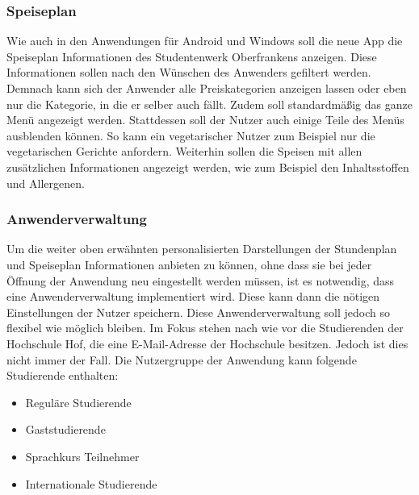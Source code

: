 \subsubsection{Speiseplan}

Wie auch in den Anwendungen für Android und Windows soll die neue \ac{App} die Speiseplan Informationen des Studentenwerk Oberfrankens anzeigen. Diese Informationen sollen nach den Wünschen des Anwenders gefiltert werden. Demnach kann sich der Anwender alle Preiskategorien anzeigen lassen oder eben nur die Kategorie, in die er selber auch fällt. Zudem soll standardmäßig das ganze Menü angezeigt werden. Stattdessen soll der Nutzer auch einige Teile des Menüs ausblenden können. So kann ein vegetarischer Nutzer zum Beispiel nur die vegetarischen Gerichte anfordern. Weiterhin sollen die Speisen mit allen zusätzlichen Informationen angezeigt werden, wie zum Beispiel den Inhaltsstoffen und Allergenen.

\subsubsection{Anwenderverwaltung}

Um die weiter oben erwähnten personalisierten Darstellungen der Stundenplan und Speiseplan Informationen anbieten zu können, ohne dass sie bei jeder Öffnung der Anwendung neu eingestellt werden müssen, ist es notwendig, dass eine Anwenderverwaltung implementiert wird. Diese kann dann die nötigen Einstellungen der Nutzer speichern. Diese Anwenderverwaltung soll jedoch so flexibel wie möglich bleiben. Im Fokus stehen nach wie vor die Studierenden der Hochschule Hof, die eine E-Mail-Adresse der Hochschule besitzen. Jedoch ist dies nicht immer der Fall. Die Nutzergruppe der Anwendung kann folgende Studierende enthalten:

\begin{itemize}

\item Reguläre Studierende

\item Gaststudierende

\item Sprachkurs Teilnehmer

\item Internationale Studierende

\end{itemize}

